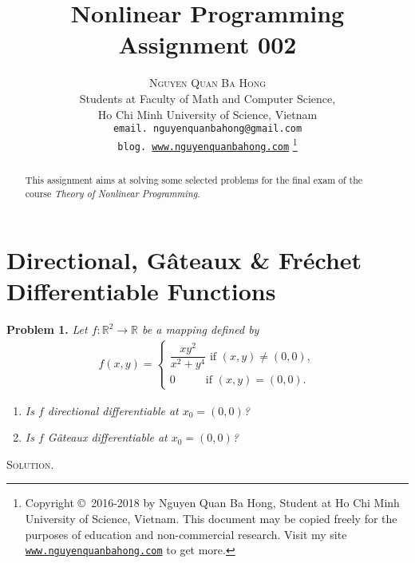 \documentclass[a4paper]{article}
\title{\huge Nonlinear Programming Assignment 002}
\author{\textsc{Nguyen Quan Ba Hong}\\
{\small Students at Faculty of Math and Computer Science,}\\ 
{\small Ho Chi Minh University of Science, Vietnam} \\
{\small \texttt{email. nguyenquanbahong@gmail.com}}\\
{\small \texttt{blog. \url{www.nguyenquanbahong.com}} 
\footnote{Copyright \copyright\ 2016-2018 by Nguyen Quan Ba Hong, Student at Ho Chi Minh University of Science, Vietnam. This document may be copied freely for the purposes of education and non-commercial research. Visit my site \texttt{\url{www.nguyenquanbahong.com}} to get more.}}}
\numberwithin{equation}{section}
\begin{document}
\maketitle
\begin{abstract}
This assignment aims at solving some selected problems for the final exam of the course \textit{Theory of Nonlinear Programming}. 
\end{abstract}
\newpage
\tableofcontents
\newpage
\section{Directional, G\^{a}teaux \& Fr\'{e}chet Differentiable Functions}
\textbf{Problem 1.} \textit{Let $f:\mathbb{R}^2\to \mathbb{R}$ be a mapping defined by}
\begin{align}
f\left( {x,y} \right) = \left\{ {\begin{array}{*{20}{c}}
{\dfrac{{x{y^2}}}{{{x^2} + {y^4}}} \mbox{ if } \left( {x,y} \right) \ne \left( {0,0} \right),}\\
{0 \hspace{1cm} \mbox{ if } \left( {x,y} \right) = \left( {0,0} \right).}
\end{array}} \right.
\end{align}
\begin{enumerate}
\item \textit{Is $f$ directional differentiable at $x_0=\left(0,0\right)$?}
\item \textit{Is $f$ G\^{a}teaux differentiable at $x_0=\left(0,0\right)$?}
\end{enumerate}
\textsc{Solution.}
\end{document}
